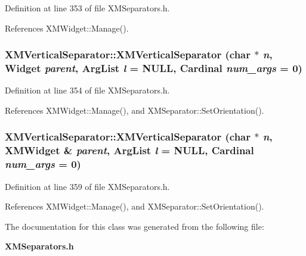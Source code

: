 Definition at line 353 of file XMSeparators.h.

References XMWidget::Manage().
\subsubsection{\setlength{\rightskip}{0pt plus 5cm}XMVertical\-Separator::XMVertical\-Separator (char $\ast$ {\em n}, Widget {\em parent}, Arg\-List {\em l} = NULL, Cardinal {\em num\_\-args} = 0)\hspace{0.3cm}{\tt  [inline]}}\label{classXMVerticalSeparator_a1}




Definition at line 354 of file XMSeparators.h.

References XMWidget::Manage(), and XMSeparator::Set\-Orientation().
\subsubsection{\setlength{\rightskip}{0pt plus 5cm}XMVertical\-Separator::XMVertical\-Separator (char $\ast$ {\em n}, {\bf XMWidget} \& {\em parent}, Arg\-List {\em l} = NULL, Cardinal {\em num\_\-args} = 0)\hspace{0.3cm}{\tt  [inline]}}\label{classXMVerticalSeparator_a2}




Definition at line 359 of file XMSeparators.h.

References XMWidget::Manage(), and XMSeparator::Set\-Orientation().

The documentation for this class was generated from the following file:\begin{CompactItemize}
\item 
{\bf XMSeparators.h}\end{CompactItemize}
